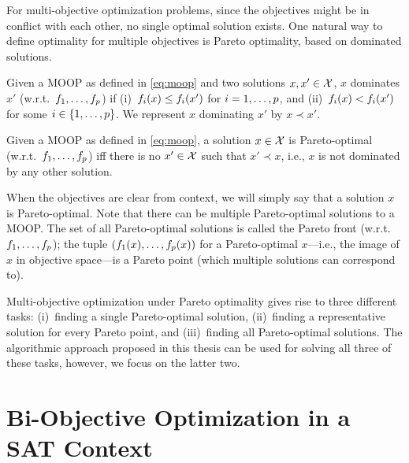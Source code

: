 For multi-objective optimization problems, since the objectives might be in conflict with each other, no single optimal solution exists.
One natural way to define optimality for multiple objectives is Pareto optimality, based on dominated solutions.
\begin{definition}
  Given a MOOP as defined in \cref{eq:moop} and two solutions $x,x' \in \mathcal{X}$, $x$ dominates $x'$ (w.r.t.\ $f_1,\dots,f_p$) if (i)~$f_i(x) \leq f_i(x')$ for $i=1,\dots,p$, and (ii)~$f_i(x) < f_i(x')$ for some $i\in\{1,\dots,p\}$.
  We represent $x$ dominating $x'$ by $x \prec x'$.
\end{definition}
\begin{definition}
  Given a MOOP as defined in \cref{eq:moop}, a solution $x \in \mathcal{X}$ is Pareto-optimal (w.r.t.\ $f_1,\dots,f_p$) iff there is no $x' \in \mathcal{X}$ such that $x' \prec x$, i.e., $x$ is not dominated by any other solution.
\end{definition}
When the objectives are clear from context, we will simply say that a solution $x$ is Pareto-optimal.
Note that there can be multiple Pareto-optimal solutions to a MOOP.
The set of all Pareto-optimal solutions is called the Pareto front (w.r.t.\ $f_1,\dots,f_p$);
the tuple $(f_1(x),\dots,f_p(x))$ for a Pareto-optimal $x$---i.e., the image of $x$ in objective space---is a Pareto point (which multiple solutions can correspond to).

Multi-objective optimization under Pareto optimality gives rise to three different tasks:
(i)~finding a single Pareto-optimal solution, (ii)~finding a representative solution for every Pareto point, and (iii)~finding all Pareto-optimal solutions.
The algorithmic approach proposed in this thesis can be used for solving all three of these tasks, however, we focus on the latter two.

\section{Bi-Objective Optimization in a SAT Context\label{sec:biopt}}

